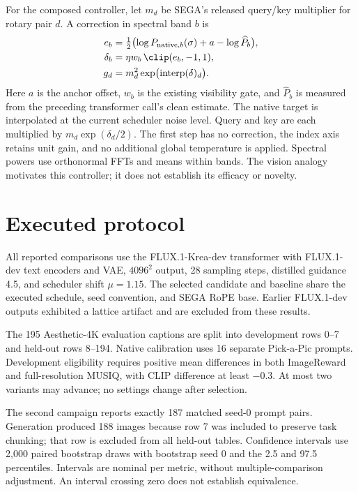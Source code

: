 For the composed controller, let $m_d$ be SEGA's released query/key multiplier
for rotary pair $d$. A correction in spectral band $b$ is
\begin{align}
 e_b &= \tfrac12\bigl(\log P_{\mathrm{native},b}(\sigma)
              + a - \log \widehat P_b\bigr),\\
 \delta_b &= \eta w_b\,\clip(e_b,-1,1),\\
 g_d &= m_d^2\exp\bigl(\operatorname{interp}(\delta)_d\bigr).
\end{align}
Here $a$ is the anchor offset, $w_b$ is the existing visibility gate, and
$\widehat P_b$ is measured from the preceding transformer call's clean estimate.
The native target is interpolated at the current scheduler noise level.
Query and key are each multiplied by $m_d\exp(\delta_d/2)$.
The first step has no correction, the index axis retains unit gain, and no
additional global temperature is applied. Spectral powers use orthonormal
FFTs and means within bands. The vision analogy motivates this controller;
it does not establish its efficacy or novelty.



\section{Executed protocol}
All reported comparisons use the FLUX.1-Krea-dev transformer with FLUX.1-dev
text encoders and VAE, $4096^2$ output, 28 sampling steps, distilled guidance
4.5, and scheduler shift $\mu=1.15$. The selected candidate and baseline share
the executed schedule, seed convention, and SEGA RoPE base. Earlier FLUX.1-dev
outputs exhibited a lattice artifact and are excluded from these results.

The 195 Aesthetic-4K evaluation captions are split into development rows 0--7
and held-out rows 8--194. Native calibration uses 16 separate Pick-a-Pic
prompts. Development eligibility requires positive mean differences in both
ImageReward and full-resolution MUSIQ, with CLIP difference at least $-0.3$.
At most two variants may advance; no settings change after selection.

The second campaign reports exactly 187 matched seed-0 prompt pairs. Generation
produced 188 images because row 7 was included to preserve task chunking; that
row is excluded from all held-out tables. Confidence intervals use 2,000 paired
bootstrap draws with bootstrap seed 0 and the 2.5 and 97.5 percentiles.
Intervals are nominal per metric, without multiple-comparison adjustment.
An interval crossing zero does not establish equivalence.

